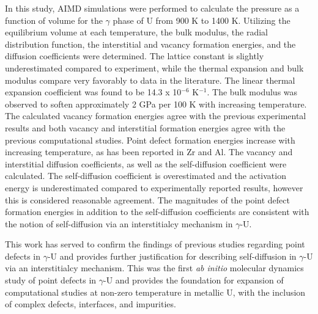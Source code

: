 \documentclass[review]{elsarticle}
\begin{document}
In this study, AIMD simulations were performed to calculate the pressure as a function of volume for the $\gamma$ phase of U from 900 K to 1400 K. Utilizing the equilibrium volume at each temperature, the bulk modulus, the radial distribution function, the interstitial and vacancy formation energies, and the diffusion coefficients were determined. The lattice constant is slightly underestimated compared to experiment, while the thermal expansion and bulk modulus compare very favorably to data in the literature. The linear thermal expansion coefficient was found to be 14.3 x 10$^{-6}$ K$^{-1}$. The bulk modulus was observed to soften approximately 2 GPa per 100 K with increasing temperature. The calculated vacancy formation energies agree with the previous experimental results and both vacancy and interstitial formation energies agree with the previous computational studies. Point defect formation energies increase with increasing temperature, as has been reported in Zr and Al. The vacancy and interstitial diffusion coefficients, as well as the self-diffusion coefficient were calculated. The self-diffusion coefficient is overestimated and the activation energy is underestimated compared to experimentally reported results, however this is considered reasonable agreement. The magnitudes of the point defect formation energies in addition to the self-diffusion coefficients are consistent with the notion of self-diffusion via an interstitialcy mechanism in $\gamma$-U. 

This work has served to confirm the findings of previous studies regarding point defects in $\gamma$-U and provides further justification for describing self-diffusion in $\gamma$-U via an interstitialcy mechanism. This was the first \textit{ab initio} molecular dynamics study of point defects in $\gamma$-U and provides the foundation for expansion of computational studies at non-zero temperature in metallic U, with the inclusion of complex defects, interfaces, and impurities.
\end{document}
